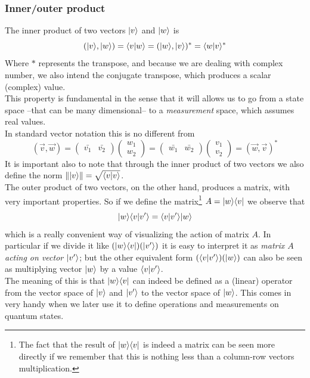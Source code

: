 	
	\subsubsection*{Inner/outer product}
	The inner product of two vectors $|v \rangle$ and $|w \rangle$ is
	$$ ( |v \rangle , |w \rangle ) = \langle v|w\rangle = (|w \rangle , |v \rangle )^{\ast} = \langle w|v\rangle^{\ast} $$
	Where $\ast$ represents the transpose, and because we are dealing with complex number, we also intend the conjugate transpose,	which produces a scalar (complex) value.\\ %
	This property is fundamental in the sense that it will allows us to go from a state space --that can be many dimensional-- to a \textit{measurement} space, which assumes real values.\\ %
	In standard vector notation this is no different from
	$$ ( \vec{v}, \vec{w} ) =  \begin{pmatrix} \bar{v_1} & \bar{v_2}\end{pmatrix} \begin{pmatrix} w_1 \\ w_2 \end{pmatrix} = \begin{pmatrix} \bar{w_1} & \bar{w_2}\end{pmatrix} \begin{pmatrix} v_1 \\ v_2 \end{pmatrix} = ( \vec{w}, \vec{v} )^{\ast}$$
	It is important also to note that through the inner product of two vectors we also define the norm $\Vert|v \rangle\Vert  =  \sqrt{\langle v|v\rangle} $.\\
	
	
	The outer product of two vectors, on the other hand, produces a matrix, with very important properties. So if we define the matrix\footnote{The fact that the result of  $ |w \rangle\langle v| $ is indeed a matrix can be seen more directly if we remember that this is nothing less than a column-row vectors multiplication.} $A =  |w \rangle\langle v| $ we observe that
	$$ |w \rangle\langle v|v'\rangle = \langle v|v'\rangle|w \rangle $$	
	which is a really convenient way of visualizing the action of matrix $A$. In particular if we divide it like $(|w \rangle\langle v|) (|v' \rangle) $ it is easy to interpret it as \textit{matrix $A$ acting on vector $|v' \rangle$}; but the other equivalent form $(\langle v|v'\rangle)(|w \rangle)$ can also be seen as multiplying vector $|w \rangle$ by a value $\langle v|v'\rangle$. \\
	The meaning of this is that $|w \rangle\langle v|$ can indeed be defined as a (linear) operator from the vector space of $|v \rangle$ and $|v' \rangle$ to the vector space of $|w \rangle$. This comes in very handy when we later use it to define operations and measurements on quantum states.\\ %
	
